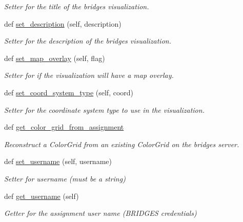 \begin{DoxyCompactItemize}
\begin{DoxyCompactList}\small\item\em Setter for the title of the bridges visualization. \end{DoxyCompactList}\item 
def \hyperlink{classbridges_1_1bridges_1_1_bridges_aba86088c031b505bbe88dbc530bf1331}{set\+\_\+description} (self, description)
\begin{DoxyCompactList}\small\item\em Setter for the description of the bridges visualization. \end{DoxyCompactList}\item 
def \hyperlink{classbridges_1_1bridges_1_1_bridges_ae9ed34b5878d9d120949da0b7e4d2911}{set\+\_\+map\+\_\+overlay} (self, flag)
\begin{DoxyCompactList}\small\item\em Setter for if the visualization will have a map overlay. \end{DoxyCompactList}\item 
def \hyperlink{classbridges_1_1bridges_1_1_bridges_a6bc905490b1995234f88f47af9aa8a17}{set\+\_\+coord\+\_\+system\+\_\+type} (self, coord)
\begin{DoxyCompactList}\small\item\em Setter for the coordinate system type to use in the visualization. \end{DoxyCompactList}\item 
def \hyperlink{classbridges_1_1bridges_1_1_bridges_a11c2be346fba56589955894c5f84747d}{get\+\_\+color\+\_\+grid\+\_\+from\+\_\+assignment}
\begin{DoxyCompactList}\small\item\em Reconstruct a Color\+Grid from an existing Color\+Grid on the bridges server. \end{DoxyCompactList}\item 
def \hyperlink{classbridges_1_1bridges_1_1_bridges_a3f97735d336faf40585e99362d64a3ee}{set\+\_\+username} (self, username)
\begin{DoxyCompactList}\small\item\em Setter for username (must be a string) \end{DoxyCompactList}\item 
def \hyperlink{classbridges_1_1bridges_1_1_bridges_abf6fdb19db336c2ed14987fdd89d65fe}{get\+\_\+username} (self)
\begin{DoxyCompactList}\small\item\em Getter for the assignment user name (B\+R\+I\+D\+G\+ES credentials) \end{DoxyCompactList}\item 

\end{DoxyCompactItemize}
